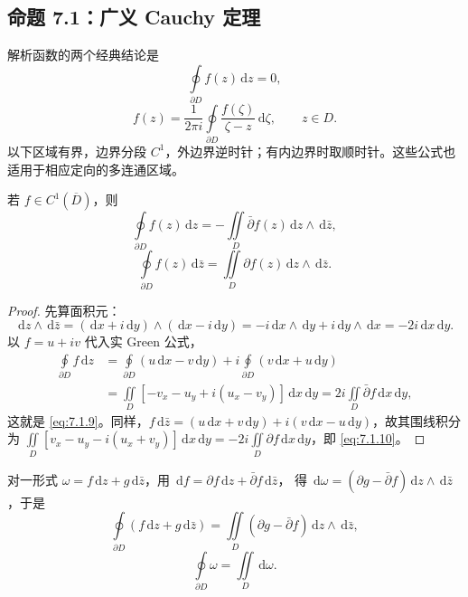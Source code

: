 \documentclass[lang=cn,scheme=chinese,mode=simple,device=normal,color=blue,math=cm,thmcnt=section,12pt]{elegantbook}
\newcommand{\dd}{\,\mathrm{d}}
\newcommand{\eqq}[2]{\tag{#1}\label{eq:#1}#2}
\begin{document}
\subsection{命题 7.1：广义 Cauchy 定理}
解析函数的两个经典结论是
\begin{equation}
\eqq{7.1.7}{\oint\limits_{\partial D}f(z)\dd z=0,}
\end{equation}
\begin{equation}
\eqq{7.1.8}{f(z)=\dfrac{1}{2\pi i}\oint\limits_{\partial D}\dfrac{f(\zeta)}{\zeta-z}\dd\zeta,\qquad z\in D.}
\end{equation}
以下区域有界，边界分段 $C^1$，外边界逆时针；有内边界时取顺时针。这些公式也适用于相应定向的多连通区域。
\begin{proposition}
若 $f\in C^1(\overline D)$，则
\begin{equation}
\eqq{7.1.9}{\oint\limits_{\partial D}f(z)\dd z=-\iint\limits_D\bar\partial f(z)\dd z\wedge\dd\bar z,}
\end{equation}
\begin{equation}
\eqq{7.1.10}{\oint\limits_{\partial D}f(z)\dd\bar z=\iint\limits_D\partial f(z)\dd z\wedge\dd\bar z.}
\end{equation}
\end{proposition}
\begin{proof}
先算面积元：
\[
\dd z\wedge\dd\bar z=(\dd x+i\dd y)\wedge(\dd x-i\dd y)
=-i\dd x\wedge\dd y+i\dd y\wedge\dd x=-2i\dd x\dd y.
\]
以 $f=u+iv$ 代入实 Green 公式，
\[
\begin{aligned}
\oint\limits_{\partial D}f\dd z
&=\oint\limits_{\partial D}(u\dd x-v\dd y)+i\oint\limits_{\partial D}(v\dd x+u\dd y)\\
&=\iint\limits_D[-v_x-u_y+i(u_x-v_y)]\dd x\dd y
=2i\iint\limits_D\bar\partial f\dd x\dd y,
\end{aligned}
\]
这就是 \eqref{eq:7.1.9}。同样，$f\dd\bar z=(u\dd x+v\dd y)+i(v\dd x-u\dd y)$，故其围线积分为
$\displaystyle\iint\limits_D[v_x-u_y-i(u_x+v_y)]\dd x\dd y=-2i\iint\limits_D\partial f\dd x\dd y$，即 \eqref{eq:7.1.10}。
\end{proof}
对一形式 $\omega=f\dd z+g\dd\bar z$，用 $\dd f=\partial f\dd z+\bar\partial f\dd\bar z$，
得 $\dd\omega=(\partial g-\bar\partial f)\dd z\wedge\dd\bar z$，于是
\begin{equation}
\eqq{7.1.11}{\oint\limits_{\partial D}(f\dd z+g\dd\bar z)=\iint\limits_D(\partial g-\bar\partial f)\dd z\wedge\dd\bar z,}
\end{equation}
\begin{equation}
\eqq{7.1.12}{\oint\limits_{\partial D}\omega=\iint\limits_D\dd\omega.}
\end{equation}
\end{document}
